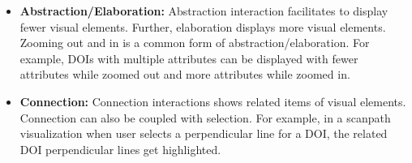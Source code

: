 \begin{itemize}
	\item \textbf{Abstraction/Elaboration:} Abstraction interaction facilitates to display fewer visual elements. Further, elaboration displays more visual elements. Zooming out and in is a common form of abstraction/elaboration. For example, DOIs with multiple attributes can be displayed with fewer attributes while zoomed out and more attributes while zoomed in. 	
	\item \textbf{Connection:} Connection interactions shows related items of visual elements. Connection can also be coupled with selection. For example, in a scanpath visualization when user selects a perpendicular line for a DOI, the related DOI perpendicular lines get highlighted. 
\end{itemize}



